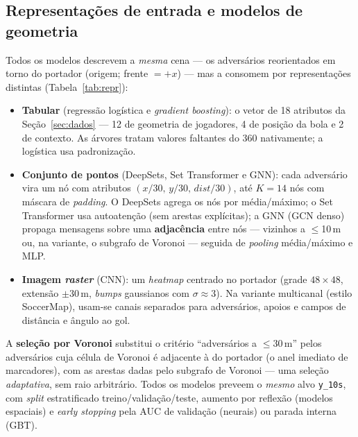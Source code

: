 \documentclass[a4paper,11pt]{article}
\begin{document}
\subsection{Representações de entrada e modelos de geometria}
Todos os modelos descrevem a \emph{mesma} cena --- os adversários reorientados em torno do portador (origem; frente $=+x$) --- mas a consomem por representações distintas (Tabela~\ref{tab:repr}):

\begin{itemize}
\item \textbf{Tabular} (regressão logística e \emph{gradient boosting}): o vetor de 18 atributos da Seção~\ref{sec:dados} --- 12 de geometria de jogadores, 4 de posição da bola e 2 de contexto. As árvores tratam valores faltantes do 360 nativamente; a logística usa padronização.
\item \textbf{Conjunto de pontos} (DeepSets, Set Transformer e GNN): cada adversário vira um nó com atributos $(x/30,\,y/30,\,\mathit{dist}/30)$, até $K=14$ nós com máscara de \emph{padding}. O DeepSets agrega os nós por média/máximo; o Set Transformer usa autoatenção (sem arestas explícitas); a GNN (GCN denso) propaga mensagens sobre uma \textbf{adjacência} entre nós --- vizinhos a $\le$10\,m ou, na variante, o subgrafo de Voronoi --- seguida de \emph{pooling} média/máximo e MLP.
\item \textbf{Imagem \emph{raster}} (CNN): um \emph{heatmap} centrado no portador (grade $48\times48$, extensão $\pm30$\,m, \emph{bumps} gaussianos com $\sigma\approx3$). Na variante multicanal (estilo SoccerMap), usam-se canais separados para adversários, apoios e campos de distância e ângulo ao gol.
\end{itemize}

A \textbf{seleção por Voronoi} substitui o critério ``adversários a $\le$30\,m'' pelos adversários cuja célula de Voronoi é adjacente à do portador (o anel imediato de marcadores), com as arestas dadas pelo subgrafo de Voronoi --- uma seleção \emph{adaptativa}, sem raio arbitrário. Todos os modelos preveem o \emph{mesmo} alvo \texttt{y\_10s}, com \emph{split} estratificado treino/validação/teste, aumento por reflexão (modelos espaciais) e \emph{early stopping} pela AUC de validação (neurais) ou parada interna (GBT).
\end{document}
